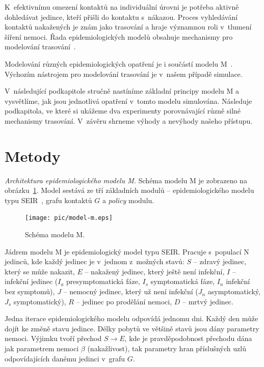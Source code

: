 K~efektivnímu omezení kontaktů na individuální úrovni je potřeba
aktivně dohledávat jedince, kteří přišli do kontaktu s~nákazou. Proces
vyhledávání kontaktů nakažených je znám jako trasování a hraje
významnou roli v~tlumení šíření nemoci. Řada epidemiologických modelů
obsahuje mechanismy pro modelování
trasování~\cite{pg:mooney2020,pg:kucharski2020,pg:Kerr2020,pg:keeling2020,pg:bilinski2020}.


Modelování různých epidemiologických opatření je i součástí 
modelu M~\cite{M-techrep2021}. Výchozím nástrojem pro modelování trasování je v~našem případě simulace.

V~následující podkapitole stručně nastíníme základní principy modelu M
a vy\-svět\-lí\-me, jak jsou jednotlivá opatření v~tomto modelu
simulována. Následuje podkapitola, ve které si ukážeme dva experimenty
porovnávající různě silné mechanismy trasování. V~závěru shrneme
výhody a nevýhody našeho přístupu.


\section*{Metody}

\emph{Architektura epidemiologického modelu M.} Schéma modelu M je zobrazeno na ob\-ráz\-ku~\ref{pg:fig:mm}. Model sestává ze
tří základních modulů -- epidemiologického modelu typu
SEIR~\cite{pg:bailey1975}, grafu kontaktů $G$ a {\em policy} modulu.

\begin{figure}[ht]
  \centering
  \texttt{[image: pic/model-m.eps]}
  \caption{Schéma modelu M.}
  \label{pg:fig:mm}
\end{figure}



Jádrem modelu M je epidemiologický model typu SEIR. Pracuje s~populací N
jedinců, kde každý jedinec je v~jednom z~možných stavů: $S$ -- zdravý jedinec,
který se může nakazit, $E$ -- nakažený jedinec, který ještě není infekční, $I$ --
infekční jedinec ($I_a$ presymptomatická fáze, $I_s$ symptomatická fáze, $I_n$
infekční bez symptomů),  $J$ -- nemocný jedinec, který už není infekční ($J_n$
asymptomatický, $J_s$ symptomatický), $R$ -- jedinec po prodělání nemoci, $D$ --
mrtvý jedinec.

Jedna iterace epidemiologického modelu odpovídá jednomu dni. Každý den
může dojít ke změně stavu jedince. Délky pobytů ve většině stavů jsou
dány parametry nemoci. Výjimku tvoří přechod $S \rightarrow E$, kde
je pravděpodobnost přechodu dána jak parametrem nemoci $\beta$
(nakažlivost), tak parametry hran příslušných uzlů odpovídajících
danému jedinci v~grafu $G$.

